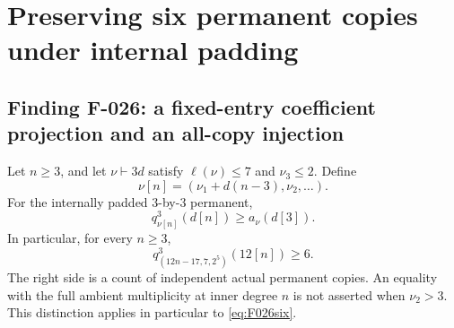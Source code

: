 \section{Preserving six permanent copies under internal padding}

\subsection*{Finding F-026: a fixed-entry coefficient projection and an all-copy injection}
Let \(n\geq3\), and let \(\nu\vdash3d\) satisfy
\(\ell(\nu)\leq7\) and \(\nu_3\leq2\). Define
\[
                    \nu[n]=(\nu_1+d(n-3),\nu_2,\ldots).
\]
For the internally padded \(3\)-by-\(3\) permanent,
\begin{equation}\label{eq:F026copies}
                   q^3_{\nu[n]}(d[n])\geq a_\nu(d[3]).
\end{equation}
In particular, for every \(n\geq3\),
\begin{equation}\label{eq:F026six}
              q^3_{(12n-17,7,2^5)}(12[n])\geq6.
\end{equation}
The right side is a count of independent actual permanent
copies. An equality with the full ambient multiplicity
at inner degree \(n\) is not asserted when \(\nu_2>3\).
This distinction applies in particular to \eqref{eq:F026six}.


